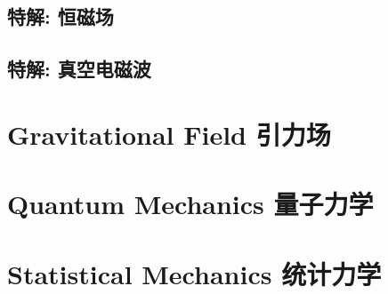 \documentclass{article}
\begin{document}
\subsection{特解: 恒磁场}


\subsection{特解: 真空电磁波}




\section{Gravitational Field 引力场}



\section{Quantum Mechanics 量子力学}



\section{Statistical Mechanics 统计力学}
\end{document}
